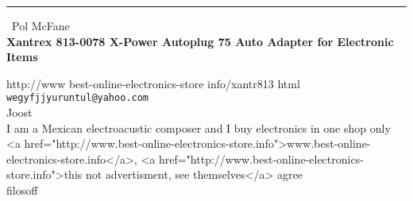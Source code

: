 \documentclass{report}
\begin{document}
\begin{center}
\rule{6in}{1pt} \
{\large Pol McFane \\
{\bf Xantrex 813-0078 X-Power Autoplug 75 Auto Adapter for Electronic Items}}

http://www best-online-electronics-store info/xantr813 html
\\
{\tt wegyfjjyuruntul@yahoo.com}\\
 Joost\\
I am a Mexican electroacustic composer and I buy electronics in one shop only <a href="http://www.best-online-electronics-store.info">www.best-online-electronics-store.info</a>, <a href="http://www.best-online-electronics-store.info">this not advertisment, see themselves</a> agree\\
	filosoff\end{center}
\end{document}
